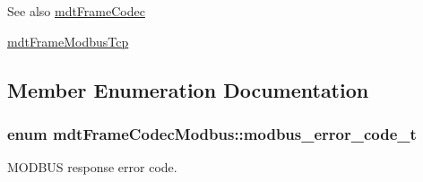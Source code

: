 \begin{DoxySeeAlso}{See also}
\hyperlink{classmdt_frame_codec}{mdtFrameCodec} 

\hyperlink{classmdt_frame_modbus_tcp}{mdtFrameModbusTcp} 
\end{DoxySeeAlso}


\subsection{Member Enumeration Documentation}
\hypertarget{classmdt_frame_codec_modbus_a31d8291be7f8636d5d295ce3066d7ac7}{
\subsubsection[{modbus\_\-error\_\-code\_\-t}]{\setlength{\rightskip}{0pt plus 5cm}enum {\bf mdtFrameCodecModbus::modbus\_\-error\_\-code\_\-t}}}
\label{classmdt_frame_codec_modbus_a31d8291be7f8636d5d295ce3066d7ac7}


MODBUS response error code. 

